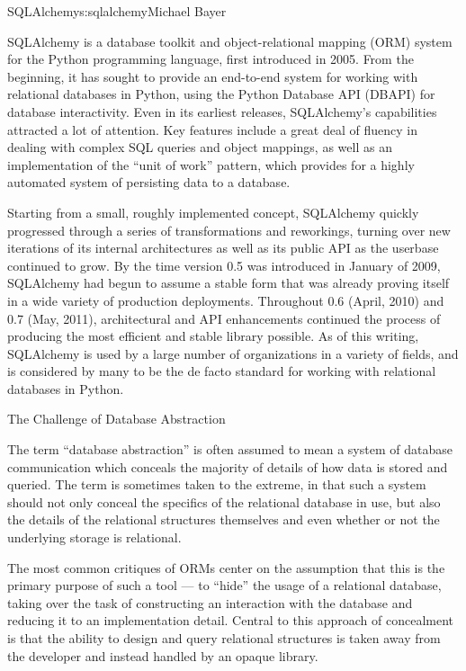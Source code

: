 \begin{aosachapter}{SQLAlchemy}{s:sqlalchemy}{Michael Bayer}

SQLAlchemy is a database toolkit and object-relational mapping (ORM) system
for the Python programming language, first introduced in 2005. From the
beginning, it has sought to provide an end-to-end system for working with
relational databases in Python, using the Python Database API (DBAPI) for
database interactivity. Even in its earliest releases, SQLAlchemy's
capabilities attracted a lot of attention. Key features include a great deal
of fluency in dealing with complex SQL queries and object mappings, as well as an
implementation of the ``unit of work'' pattern, which provides for a highly
automated system of persisting data to a database.

Starting from a small, roughly implemented concept, SQLAlchemy quickly
progressed through a series of transformations and reworkings, turning over
new iterations of its internal architectures as well as its public API as the
userbase continued to grow. By the time version 0.5 was introduced in January
of 2009, SQLAlchemy had begun to assume a stable form that was already proving
itself in a wide variety of production deployments. Throughout 0.6 (April,
2010) and 0.7 (May, 2011), architectural and API enhancements continued the
process of producing the most efficient and stable library possible. As of
this writing, SQLAlchemy is used by a large number of organizations in a
variety of fields, and is considered by many to be the de facto standard for
working with relational databases in Python.

\begin{aosasect1}{The Challenge of Database Abstraction}

The term ``database abstraction'' is often assumed to mean a system of database
communication which conceals the majority of details of how data is stored and
queried. The term is sometimes taken to the extreme, in that such a system
should not only conceal the specifics of the relational database in use, but
also the details of the relational structures themselves and even whether or
not the underlying storage is relational.

The most common critiques of ORMs center on the assumption that this is the
primary purpose of such a tool --- to ``hide'' the usage of a relational database,
taking over the task of constructing an interaction with the database and
reducing it to an implementation detail.  Central to this approach of
concealment is that the ability to design and query relational structures is
taken away from the developer and instead handled by an opaque library.


\end{aosasect1}
\end{aosachapter}
